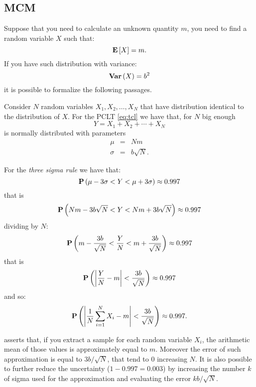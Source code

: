 \documentclass[dissertation.tex]{subfiles}
\begin{document}
\subsection{\acf{MCM}}
Suppose that you need to calculate an unknown quantity $m$, you need
to find a random variable $X$ such that:
\begin{equation*}
  \mathrm{\textbf{E}}\left[X\right] = m.
\end{equation*}
If you have such distribution with variance:
\begin{equation*}
  \mathrm{\textbf{Var}}\left(X\right) = b^2
\end{equation*}
it is possible to formalize the following passages.

Consider $N$ random variables $X_1,X_2,\dots,X_N$ that have
distribution identical to the distribution of $X$. For the \ac{PCLT}
\cref{eq:tcl} we have that, for $N$ big enough
\begin{equation*}
  Y=X_1+X_2+\cdots+X_N
\end{equation*}
is normally distributed with parameters
\begin{eqnarray*}
  \mu &=& Nm\\
  \sigma&=&b\sqrt{N}.
\end{eqnarray*}

For the \emph{three sigma rule} \cite{pukelsheim} we have that:
\begin{equation*}
  \mathrm{\textbf{P}}\left(\mu-3\sigma < Y <\mu +3\sigma\right)\approx 0.997
\end{equation*}
that is
\begin{equation*}
  \mathrm{\textbf{P}}\left(Nm-3b\sqrt{N} < Y < Nm+3b\sqrt{N}\right)\approx 0.997
\end{equation*}
dividing by $N$:
\begin{equation*}
  \mathrm{\textbf{P}}\left(m-\frac{3b}{\sqrt{N}} < \frac{Y}{N} <
    m+\frac{3b}{\sqrt{N}}\right)\approx 0.997
\end{equation*}
that is
\begin{equation*}
  \mathrm{\textbf{P}}\left(\left|\frac{Y}{N}-m\right| <\frac{3b}{\sqrt{N}}\right)\approx 0.997
\end{equation*}
and so:
\begin{equation}\label{eq:mc}
  \mathrm{\textbf{P}}\left(\left|\frac{1}{N}\sum_{i=1}^NX_i-m\right| <\frac{3b}{\sqrt{N}}\right)\approx 0.997.
\end{equation}

 asserts that, if you extract a sample for each random
variable $X_i$, the arithmetic mean of those values is approximately
equal to $m$. Moreover the error of such approximation is equal to
$3b/\sqrt{N}$, that tend to $0$ increasing $N$. It is also possible to
further 
reduce the uncertainty ($1-0.997=0.003$) by increasing the number $k$ of
sigma used for the
approximation and evaluating the error $kb/\sqrt{N}$.
\end{document}
